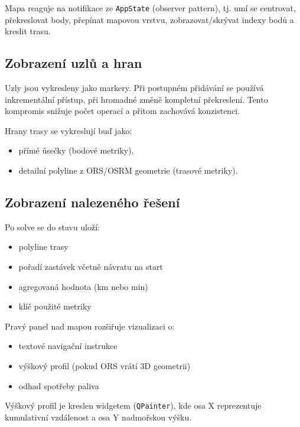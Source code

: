 Mapa reaguje na notifikace ze \texttt{AppState} (observer pattern), tj. umí se centrovat, překreslovat body, přepínat mapovou vrstvu, zobrazovat/skrývat indexy bodů a kreslit trasu.



\subsection{Zobrazení uzlů a hran}
Uzly jsou vykresleny jako markery. Při postupném přidávání se používá inkrementální přístup, při hromadné změně kompletní překreslení. Tento kompromis snižuje počet operací a přitom zachovává konzistenci.

Hrany trasy se vykreslují buď jako:
\begin{itemize}
    \item přímé úsečky (bodové metriky),
    \item detailní polyline z ORS/OSRM geometrie (trasové metriky).
\end{itemize}

\subsection{Zobrazení nalezeného řešení}
Po solve se do stavu uloží:
\begin{itemize}
    \item polyline trasy
    \item pořadí zastávek včetně návratu na start
    \item agregovaná hodnota (km nebo min)
    \item klíč použité metriky
\end{itemize}

Pravý panel nad mapou rozšiřuje vizualizaci o:
\begin{itemize}
    \item textové navigační instrukce
    \item výškový profil (pokud ORS vrátí 3D geometrii)
    \item odhad spotřeby paliva
\end{itemize}

Výškový profil je kreslen  widgetem (\texttt{QPainter}), kde osa X reprezentuje kumulativní vzdálenost a osa Y nadmořskou výšku.

